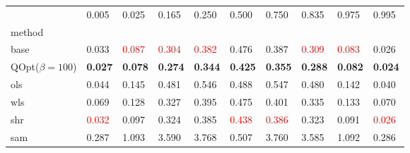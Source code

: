 \begin{tabular}{llllllllll}
\toprule
 & 0.005 & 0.025 & 0.165 & 0.250 & 0.500 & 0.750 & 0.835 & 0.975 & 0.995 \\
method &  &  &  &  &  &  &  &  &  \\
\midrule
base & 0.033 & \textcolor{red}{0.087} & \textcolor{red}{0.304} & \textcolor{red}{0.382} & 0.476 & 0.387 & \textcolor{red}{0.309} & \textcolor{red}{0.083} & 0.026 \\
\midrule
QOpt($\beta=100$) & \textbf{0.027} & \textbf{0.078} & \textbf{0.274} & \textbf{0.344} & \textbf{0.425} & \textbf{0.355} & \textbf{0.288} & \textbf{0.082} & \textbf{0.024} \\
ols & 0.044 & 0.145 & 0.481 & 0.546 & 0.488 & 0.547 & 0.480 & 0.142 & 0.040 \\
wls & 0.069 & 0.128 & 0.327 & 0.395 & 0.475 & 0.401 & 0.335 & 0.133 & 0.070 \\
shr & \textcolor{red}{0.032} & 0.097 & 0.324 & 0.385 & \textcolor{red}{0.438} & \textcolor{red}{0.386} & 0.323 & 0.091 & \textcolor{red}{0.026} \\
sam & 0.287 & 1.093 & 3.590 & 3.768 & 0.507 & 3.760 & 3.585 & 1.092 & 0.286 \\
\bottomrule
\end{tabular}